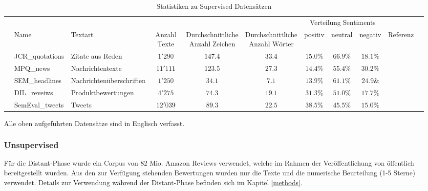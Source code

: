 \begin{table}[h]
	\begin{adjustbox}{max width=\textwidth}
		\begin{tabular}{@{}lllcccccccl@{}}
			\toprule
			& & & & & & \multicolumn{3}{c}{Verteilung Sentiments} &\\
			\cmidrule(r){7-9}
			& Name & Textart & Anzahl Texte & \specialcell{Durchschnittliche\\Anzahl Zeichen} & \specialcell{Durchschnittliche\\Anzahl Wörter} & positiv & neutral & negativ & Referenz &\\ \midrule
			& JCR{\_}quotations & Zitate aus Reden & $1'290$ & $147.4$ & $33.4$ & $15.0\%$ & $66.9\%$ & $18.1\%$ & \cite{cieliebak2013potential}\\
			& MPQ{\_}news & Nachrichtentexte & $11'111$ & $123.5$ & $27.3$ & $14.4\%$ & $55.4\%$ & $30.2\%$ & \cite{cieliebak2013potential}\\
			& SEM{\_}headlines & Nachrichtenüberschriften & $1'250$ & $34.1$ & $7.1$ & $13.9\%$ & $61.1\%$ & $24.9\&$ & \cite{cieliebak2013potential}\\
			& DIL{\_}reveiws & Produktbewertungen & $4'275$ & $74.3$ & $19.1$ & $31.3\%$ & $51.0\%$ & $17.7\%$ & \cite{cieliebak2013potential}\\
			& SemEval{\_}tweets & Tweets & $12'039$ & $89.3$ & $22.5$ & $38.5\%$ & $45.5\%$ & $15.0\%$ & \cite{SemEval:2016:task4}\\
			\bottomrule
		\end{tabular}
	\end{adjustbox}
	\caption{Statistiken zu Supervised Datensätzen}
\end{table}

Alle oben aufgeführten Datensätze sind in Englisch verfasst.

\subsubsection{Unsupervised}
Für die Distant-Phase wurde ein Corpus von 82 Mio. Amazon Reviews verwendet, welche im Rahmen der Veröffentlichung von \cite{zhang2015character} öffentlich bereitgestellt wurden. Aus den zur Verfügung stehenden Bewertungen wurden nur die Texte und die numerische Beurteilung (1-5 Sterne) verwendet. Details zur Verwendung während der Distant-Phase befinden sich im Kapitel \ref{methods}.\\\\

